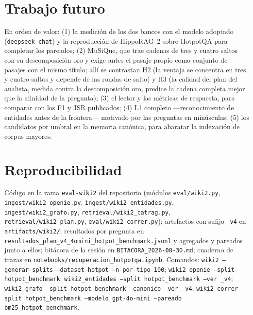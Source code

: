 \documentclass[11pt,a4paper]{article}
\newcommand{\hippo}{HippoRAG~2}
\begin{document}
\section{Trabajo futuro}
\label{sec:futuro}

En orden de valor: (1) la medición de los dos bancos con el modelo adoptado
(\texttt{deepseek-chat}) y la reproducción de \hippo{} sobre HotpotQA para
completar los pareados; (2) MuSiQue, que trae cadenas de tres y cuatro
saltos con su descomposición oro y exige antes el pasaje propio como
conjunto de pasajes con el mismo título; allí se contrastan H2 (la ventaja
se concentra en tres y cuatro saltos y depende de las rondas de salto) y H3
(la calidad del plan del analista, medida contra la descomposición oro,
predice la cadena completa mejor que la afinidad de la pregunta); (3) el
lector y las métricas de respuesta, para comparar con los F1 y JSR
publicados; (4) L1 completo ---reconocimiento de entidades antes de la
frontera--- motivado por las preguntas en minúsculas; (5) los candidatos por
umbral en la memoria canónica, para abaratar la indexación de corpus
mayores.

\section*{Reproducibilidad}

Código en la rama \texttt{eval-wiki2} del repositorio (módulos
\texttt{eval/wiki2.py}, \texttt{ingest/wiki2\_openie.py},
\texttt{ingest/wiki2\_entidades.py}, \texttt{ingest/wiki2\_grafo.py},
\texttt{retrieval/wiki2\_catrag.py}, \texttt{retrieval/wiki2\_plan.py},
\texttt{eval/wiki2\_correr.py}); artefactos con sufijo \texttt{\_v4} en
\texttt{artifacts/wiki2/}; resultados por pregunta en
\texttt{resultados\_plan\_v4\_4omini\_hotpot\_benchmark.jsonl} y agregados y
pareados junto a ellos; bitácora de la sesión en
\texttt{BITACORA\_2026-08-30.md}; cuaderno de trazas en
\texttt{notebooks/recuperacion\_hotpotqa.ipynb}. Comandos:
\texttt{wiki2 --generar-splits --dataset hotpot --n-por-tipo 100};
\texttt{wiki2\_openie --split hotpot\_benchmark};
\texttt{wiki2\_entidades --split hotpot\_benchmark --ver \_v4};
\texttt{wiki2\_grafo --split hotpot\_benchmark --canonico --ver \_v4};
\texttt{wiki2\_correr --split hotpot\_benchmark --modelo gpt-4o-mini --pareado bm25\_hotpot\_benchmark}.
\end{document}
